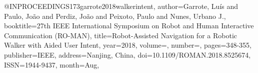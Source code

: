 @INPROCEEDINGS{173garrote2018walkerintent,
author={Garrote, Luís and Paulo, João and Perdiz, João and Peixoto, Paulo and Nunes, Urbano J.},
booktitle={27th IEEE International Symposium on Robot and Human Interactive Communication (RO-MAN)}, 
title={Robot-Assisted Navigation for a Robotic Walker with Aided User Intent}, 
year={2018},
volume={},
number={},
pages={348-355},
publisher={IEEE},
address={Nanjing, China},
doi={10.1109/ROMAN.2018.8525674},
ISSN={1944-9437},
month={Aug},}